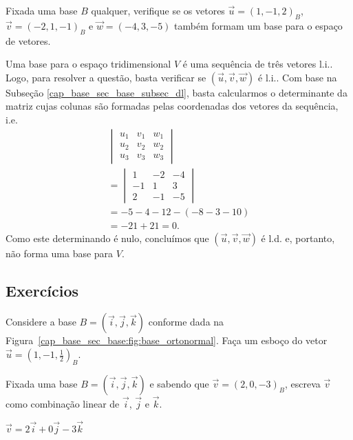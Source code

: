 \begin{exeresol}
  Fixada uma base $B$ qualquer, verifique se os vetores $\vec{u}=(1,-1,2)_B$, $\vec{v}=(-2,1,-1)_B$ e $\vec{w}=(-4,3,-5)$ também formam um base para o espaço de vetores.
\end{exeresol}
\begin{resol}
  Uma base para o espaço tridimensional $V$ é uma sequência de três vetores l.i.. Logo, para resolver a questão, basta verificar se $(\vec{u},\vec{v},\vec{w})$ é l.i.. Com base na Subseção \ref{cap_base_sec_base_subsec_dl}, basta calcularmos o determinante da matriz cujas colunas são formadas pelas coordenadas dos vetores da sequência, i.e.
  \begin{gather}
    \begin{vmatrix}
      u_1 & v_1 & w_1 \\
      u_2 & v_2 & w_2 \\
      u_3 & v_3 & w_3
    \end{vmatrix}\\
    = \begin{vmatrix}
      1 & -2 & -4 \\
      -1 & 1 & 3 \\
      2 & -1 & -5
    \end{vmatrix}\\
    = -5-4-12-(-8-3-10)\\
    = -21+21 = 0.
  \end{gather}
  Como este determinando é nulo, concluímos que $(\vec{u},\vec{v},\vec{w})$ é l.d. e, portanto, não forma uma base para $V$.
\end{resol}

\subsection{Exercícios}

\begin{exer}
  Considere a base $B=(\vec{i}, \vec{j}, \vec{k})$ conforme dada na Figura~\ref{cap_base_sec_base:fig:base_ortonormal}. Faça um esboço do vetor $\vec{u}=\left(1,-1,\frac{1}{2}\right)_B$.  
\end{exer}

\begin{exer}
  Fixada uma base $B=(\vec{i},\vec{j},\vec{k})$ e sabendo que $\vec{v}=(2, 0, -3)_B$, escreva $\vec{v}$ como combinação linear de $\vec{i}$, $\vec{j}$ e $\vec{k}$.
\end{exer}
\begin{resp}
  $\vec{v}=2\vec{i}+0\vec{j}-3\vec{k}$
\end{resp}


